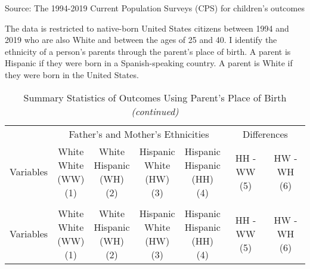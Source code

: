 
\begin{landscape}
\begin{ThreePartTable}
\begin{TableNotes}
\item[1] Source: The 1994-2019 Current Population Surveys (CPS) for children's outcomes
\item[2] The data is restricted to native-born United States citizens between 1994 and 2019 who are also White and between the ages of 25 and 40. I identify the ethnicity of a person's parents through the parent's place of birth. A parent is Hispanic if they were born in a Spanish-speaking country. A parent is White if they were born in the United States.
\end{TableNotes}
\begin{longtable}[t]{>{\raggedright\arraybackslash}p{5cm}cccccc}
\caption{Summary Statistics of Outcomes Using Parent's Place of Birth \label{tab:c&p1}}\\
\toprule
\multicolumn{1}{c}{ } & \multicolumn{4}{c}{Father's and Mother's Ethnicities} & \multicolumn{2}{c}{Differences} \\
\cmidrule(l{3pt}r{3pt}){2-5} \cmidrule(l{3pt}r{3pt}){6-7}
Variables & \specialcell{White \\ White \\ (WW) \\ (1)} & \specialcell{White \\ Hispanic \\ (WH) \\ (2)} & \specialcell{Hispanic \\ White \\ (HW) \\ (3)} & \specialcell{Hispanic \\ Hispanic \\ (HH) \\ (4)} & \specialcell{HH - WW \\ (5)} & \specialcell{HW - WH \\ (6)}\\
\midrule
\endfirsthead
\caption[]{Summary Statistics of Outcomes Using Parent's Place of Birth  \textit{(continued)}}\\
\toprule
Variables & \specialcell{White \\ White \\ (WW) \\ (1)} & \specialcell{White \\ Hispanic \\ (WH) \\ (2)} & \specialcell{Hispanic \\ White \\ (HW) \\ (3)} & \specialcell{Hispanic \\ Hispanic \\ (HH) \\ (4)} & \specialcell{HH - WW \\ (5)} & \specialcell{HW - WH \\ (6)}\\

\end{longtable}
\end{ThreePartTable}
\end{landscape}

